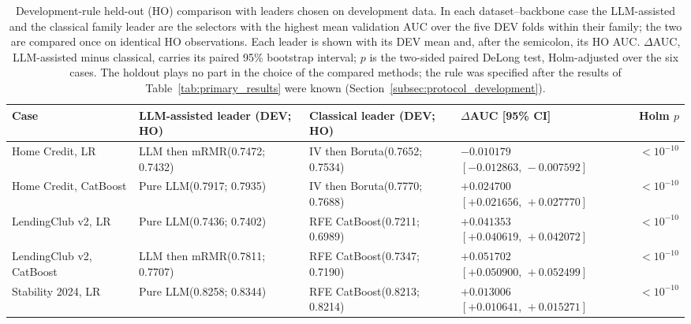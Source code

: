 \documentclass[final,5p,twocolumn]{elsarticle}
\begin{document}
\begin{table}[htbp]
\centering
\scriptsize
\setlength{\tabcolsep}{3pt}
\begin{threeparttable}
\caption{Development-rule held-out (HO) comparison with leaders chosen on development data. In each dataset--backbone case the LLM-assisted and the classical family leader are the selectors with the highest mean validation AUC over the five DEV folds within their family; the two are compared once on identical HO observations. Each leader is shown with its DEV mean and, after the semicolon, its HO AUC. $\Delta$AUC, LLM-assisted minus classical, carries its paired 95\% bootstrap interval; $p$ is the two-sided paired DeLong test, Holm-adjusted over the six cases. The holdout plays no part in the choice of the compared methods; the rule was specified after the results of Table~\ref{tab:primary_results} were known (Section~\ref{subsec:protocol_development}).}
\label{tab:confirmatory}
\begin{tabular}{@{}L{24mm}L{30mm}L{27mm}L{38mm}l@{}}
\toprule
Case & LLM-assisted leader (DEV; HO) & Classical leader (DEV; HO) & $\Delta$AUC [95\% CI] & Holm $p$ \\
\midrule
Home Credit, LR & LLM then mRMR\newline (0.7472; 0.7432) & IV then Boruta\newline (0.7652; 0.7534) & $-0.010179$\newline $[-0.012863,\,-0.007592]$ & $<10^{-10}$ \\
\addlinespace
Home Credit, CatBoost & Pure LLM\newline (0.7917; 0.7935) & IV then Boruta\newline (0.7770; 0.7688) & $+0.024700$\newline $[+0.021656,\,+0.027770]$ & $<10^{-10}$ \\
\addlinespace
LendingClub v2, LR & Pure LLM\newline (0.7436; 0.7402) & RFE CatBoost\newline (0.7211; 0.6989) & $+0.041353$\newline $[+0.040619,\,+0.042072]$ & $<10^{-10}$ \\
\addlinespace
LendingClub v2, CatBoost & LLM then mRMR\newline (0.7811; 0.7707) & RFE CatBoost\newline (0.7347; 0.7190) & $+0.051702$\newline $[+0.050900,\,+0.052499]$ & $<10^{-10}$ \\
\addlinespace
Stability 2024, LR & Pure LLM\newline (0.8258; 0.8344) & RFE CatBoost\newline (0.8213; 0.8214) & $+0.013006$\newline $[+0.010641,\,+0.015271]$ & $<10^{-10}$ \\

\end{tabular}
\end{threeparttable}
\end{table}
\end{document}
